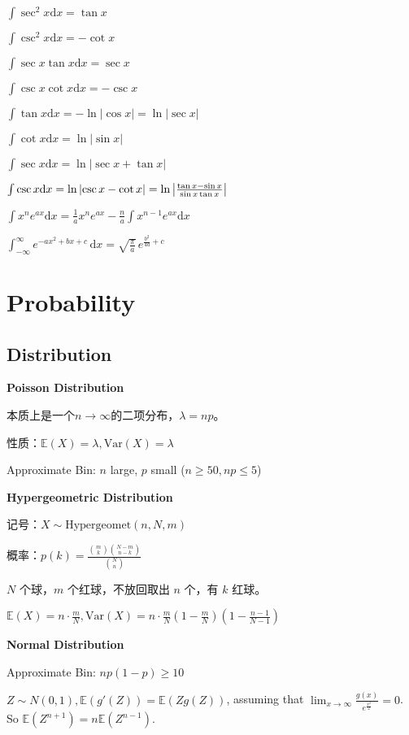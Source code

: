 \documentclass[9pt,landscape]{article}
\begin{document}
\begin{multicols}{3}
$ \int \sec ^{2}x{\mbox{d}}x=\tan x $

$ \int \csc ^{2}x{\mbox{d}}x=-\cot x $

$ \int \sec x\tan x{\mbox{d}}x=\sec x $

$ \int \csc x\cot x{\mbox{d}}x=-\csc x $

$ \int \tan x{\mbox{d}}x=-\ln {\left|\cos {x}\right|}=\ln {\left|\sec x\right|} $

$ \int \cot x{\mbox{d}}x=\ln {\left|\sin x\right|} $

$ \int \sec x{\mbox{d}}x=\ln {\left|\sec x+\tan x\right|} $

$ \int \csc x{\mbox{d}}x=\ln {\left|\csc x-\cot x\right|}=\ln {\left|{\tan x-\sin x \over \sin x\tan x}\right|} $

$ \int x^{n}e^{ax}{\mbox{d}}x={\frac {1}{a}}x^{n}e^{ax}-{\frac {n}{a}}\int x^{n-1}e^{ax}{\mbox{d}}x $

$ \int _{-\infty }^{\infty }e^{-ax^{2}+bx+c}\,\mathrm{d}x={\sqrt {\frac {\pi }{a}}}\,e^{{\frac {b^{2}}{4a}}+c} $


\section{Probability}

\subsection{Distribution}

\textbf{Poisson Distribution}

本质上是一个$n\to\infty$的二项分布，$\lambda=np$。

性质：$\mathbb{E}(X)=\lambda,\text{Var}(X)=\lambda$

Approximate Bin: $n$ large, $p$ small ($n \ge 50, np \le 5$)

\textbf{Hypergeometric Distribution}

记号：$X \sim \text{Hypergeomet}(n, N, m)$

概率：$p(k)=\frac{\binom{m}{k}\binom{N-m}{n-k}}{\binom{N}{n}}$

$N$ 个球，$m$ 个红球，不放回取出 $n$ 个，有 $k$ 红球。

$\mathbb{E}(X)=n\cdot\frac{m}{N}, \mathrm{Var}(X)=n\cdot \frac{m}{N}\left(1-\frac{m}{N}\right)\left(1-\frac{n-1}{N-1}\right)$

\textbf{Normal Distribution}

Approximate Bin: $np(1-p)\ge 10$

$Z\sim N(0, 1), \mathbb{E}(g'(Z))=\mathbb{E}(Zg(Z))$,  assuming that $\lim_{x\to \infty}\frac{g(x)}{e^{\frac{x^2}{2}}}=0$. So $\mathbb{E}(Z^{n+1})=n\mathbb{E}(Z^{n-1})$.


\end{multicols}
\end{document}
